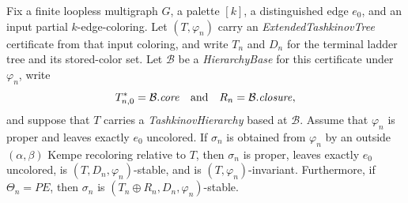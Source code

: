 \begin{lemma}
Fix a finite loopless multigraph $G$, a palette $[k]$, a distinguished
edge $e_0$, and an input partial $k$-edge-coloring.  Let
$(T,\varphi_n)$ carry an \emph{ExtendedTashkinovTree} certificate from
that input coloring, and write $T_n$ and $D_n$ for the terminal ladder
tree and its stored-color set.  Let
$\mathcal B$ be a \emph{HierarchyBase} for this certificate under
$\varphi_n$, write
\[
 T_{n,0}^{*}=\mathcal B.\mathit{core}
 \quad\hbox{and}\quad
 R_n=\mathcal B.\mathit{closure},
\]
and suppose that $T$ carries a \emph{TashkinovHierarchy} based at
$\mathcal B$.  Assume that $\varphi_n$ is proper and leaves exactly
$e_0$ uncolored.  If $\sigma_n$ is obtained from $\varphi_n$ by an
outside $(\alpha,\beta)$ Kempe recoloring relative to $T$, then
$\sigma_n$ is proper, leaves exactly $e_0$ uncolored, is
$(T,D_n,\varphi_n)$-stable, and is $(T,\varphi_n)$-invariant.
Furthermore, if $\Theta_n=PE$, then $\sigma_n$ is
$(T_n\oplus R_n,D_n,\varphi_n)$-stable.
\end{lemma}
